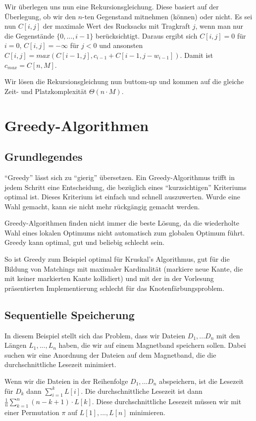 \documentclass[12pt]{article}
\begin{document}
Wir überlegen uns nun eine Rekursionsgleichung. Diese basiert auf der Überlegung, ob wir den $n$-ten Gegenstand mitnehmen (können) oder nicht. Es sei nun $C[i,j]$ der maximale Wert des Rucksacks mit Tragkraft $j$, wenn man nur die Gegenstände $\{0, ..., i-1\}$ berücksichtigt. Daraus ergibt sich $C[i,j] = 0$ für $i = 0$, $C[i,j] = -\infty$ für $j < 0$ und ansonsten $C[i,j]=max(C[i-1,j], c_{i-1}+C[i-1, j-w_{i-1}])$. Damit ist $c_{max} = C[n,M]$.

Wir lösen die Rekursionsgleichung nun buttom-up und kommen auf die gleiche Zeit- und Platzkomplexität $\Theta(n\cdot M)$.

\section{Greedy-Algorithmen}

\subsection{Grundlegendes}

\enquote{Greedy} lässt sich zu \enquote{gierig} übersetzen. Ein Greedy-Algorithmus trifft in jedem Schritt eine Entscheidung, die bezüglich eines \enquote{kurzsichtigen} Kriteriums optimal ist. Dieses Kriterium ist einfach und schnell auszuwerten. Wurde eine Wahl gemacht, kann sie nicht mehr rückgängig gemacht werden.

Greedy-Algorithmen finden nicht immer die beste Lösung, da die wiederholte Wahl eines lokalen Optimums nicht automatisch zum globalen Optimum führt. Greedy kann optimal, gut und beliebig schlecht sein.

So ist Greedy zum Beispiel optimal für Kruskal's Algorithmus, gut für die Bildung von Matchings mit maximaler Kardinalität (markiere neue Kante, die mit keiner markierten Kante kollidiert) und mit der in der Vorlesung präsentierten Implementierung schlecht für das Knotenfärbungsproblem.

\subsection{Sequentielle Speicherung}
In diesem Beispiel stellt sich das Problem, dass wir Dateien $D_1, ... D_n$ mit den Längen $L_1, ..., L_n$ haben, die wir auf einem Magnetband speichern sollen. Dabei suchen wir eine Anordnung der Dateien auf dem Magnetband, die die durchschnittliche Lesezeit minimiert.

Wenn wir die Dateien in der Reihenfolge $D_1, ... D_n$ abspeichern, ist die Lesezeit für $D_k$ dann $\sum_{i=1}^k L[i]$. Die durchschnittliche Lesezeit ist dann $\frac{1}{n} \sum_{k=1}^{n} (n-k+1)\cdot{}L[k]$. Diese durchschnittliche Lesezeit müssen wir mit einer Permutation $\pi$ auf $L[1], ..., L[n]$ minimieren.
\end{document}
